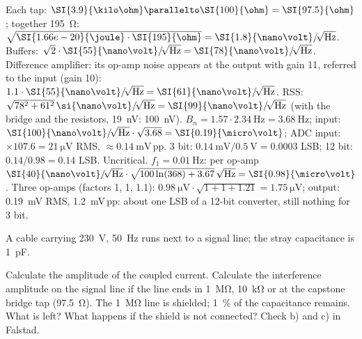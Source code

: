 \begin{solution}
\begin{talist}
\ta Each tap: $\SI{3.9}{\kilo\ohm}\parallelto\SI{100}{\ohm} = \SI{97.5}{\ohm}$; together \SI{195}{\ohm}:
	$\sqrt{\SI{1.66e-20}{\joule}\cdot\SI{195}{\ohm}} = \SI{1.8}{\nano\volt}\rtHz$.
\ta Buffers: $\sqrt{2}\cdot\SI{55}{\nano\volt}\rtHz = \SI{78}{\nano\volt}\rtHz$. Difference amplifier: its op-amp noise appears
	at the output with gain 11, referred to the input (gain 10): $1.1\cdot\SI{55}{\nano\volt}\rtHz = \SI{61}{\nano\volt}\rtHz$.
	RSS: $\sqrt{78^2 + 61^2}\,\si{\nano\volt}\rtHz = \SI{99}{\nano\volt}\rtHz$ (with the bridge and the
	resistors, \SI{19}{\nano\volt}\rtHz: \SI{100}{\nano\volt}\rtHz).
\ta $B_n = 1.57\cdot\SI{2.34}{\hertz} = \SI{3.68}{\hertz}$; input: $\SI{100}{\nano\volt}\rtHz\cdot\sqrt{3.68} = \SI{0.19}{\micro\volt}$;
	ADC input: $\times 107.6 = \SI{21}{\micro\volt}$ RMS, $\approx\SI{0.14}{\milli\volt}$\,pp.
	3 bit: $\SI{0.14}{\milli\volt}/\SI{0.5}{\volt} = 0.0003$ LSB; 12 bit: $0.14/0.98 = 0.14$ LSB. Uncritical.
\ta $f_1 = \SI{0.01}{\hertz}$: per op-amp $\SI{40}{\nano\volt}\rtHz\cdot\sqrt{100\ln(368) + 3.67}\,\sqrt{\mathrm{Hz}} = \SI{0.98}{\micro\volt}$.
	Three op-amps (factors 1, 1, 1.1): $\SI{0.98}{\micro\volt}\cdot\sqrt{1+1+1.21} = \SI{1.75}{\micro\volt}$;
	output: \SI{0.19}{\milli\volt} RMS, \SI{1.2}{\milli\volt}\,pp: about one LSB of a 12-bit converter, still nothing for 3 bit.
\end{talist}
\end{solution}

\label{ex:noise-cap}
A cable carrying \SI{230}{\volt}, \SI{50}{\hertz} runs next to a signal line; the stray capacitance is \SI{1}{\pico\farad}.
\begin{talist}
\ta Calculate the amplitude of the coupled current.
\ta Calculate the interference amplitude on the signal line if the line ends in \SI{1}{\mega\ohm}, \SI{10}{\kilo\ohm} or at the capstone bridge tap (\SI{97.5}{\ohm}).
\ta The \SI{1}{\mega\ohm} line is shielded; \SI{1}{\percent} of the capacitance remains. What is left?
\ta What happens if the shield is not connected?
\ta Check b) and c) in Falstad.
\end{talist}

